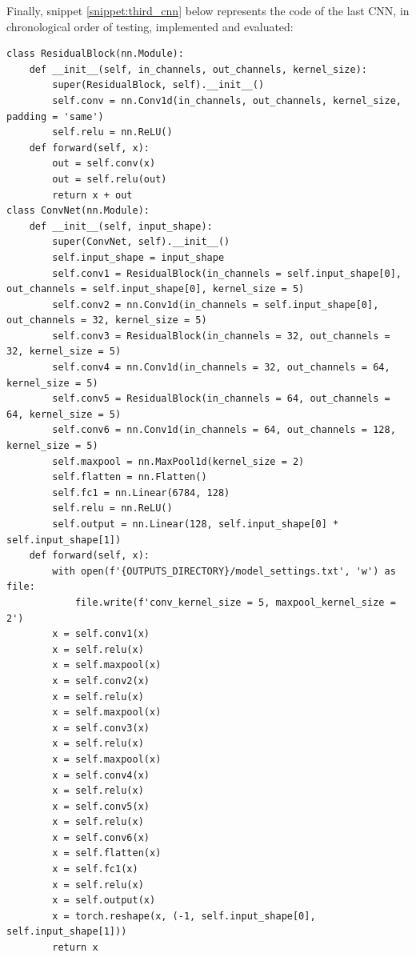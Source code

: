 \documentclass[12pt,italian]{report}
\begin{document}
Finally, snippet \ref{snippet:third_cnn} below represents the code of the last CNN, in chronological order of testing, implemented and evaluated:

\lstset{language=Python}
\begin{lstlisting}[aboveskip=15pt, belowskip=15pt, basicstyle=\fontsize{8}{10}\selectfont, keywordstyle=\color{blue}, breaklines=true, label=snippet:third_cnn]
class ResidualBlock(nn.Module):
    def __init__(self, in_channels, out_channels, kernel_size):
        super(ResidualBlock, self).__init__()
        self.conv = nn.Conv1d(in_channels, out_channels, kernel_size, padding = 'same')
        self.relu = nn.ReLU()
    def forward(self, x):
        out = self.conv(x)
        out = self.relu(out)
        return x + out
class ConvNet(nn.Module):
    def __init__(self, input_shape):
        super(ConvNet, self).__init__()
        self.input_shape = input_shape
        self.conv1 = ResidualBlock(in_channels = self.input_shape[0], out_channels = self.input_shape[0], kernel_size = 5)
        self.conv2 = nn.Conv1d(in_channels = self.input_shape[0], out_channels = 32, kernel_size = 5)
        self.conv3 = ResidualBlock(in_channels = 32, out_channels = 32, kernel_size = 5)
        self.conv4 = nn.Conv1d(in_channels = 32, out_channels = 64, kernel_size = 5)
        self.conv5 = ResidualBlock(in_channels = 64, out_channels = 64, kernel_size = 5)
        self.conv6 = nn.Conv1d(in_channels = 64, out_channels = 128, kernel_size = 5)
        self.maxpool = nn.MaxPool1d(kernel_size = 2)
        self.flatten = nn.Flatten()
        self.fc1 = nn.Linear(6784, 128)
        self.relu = nn.ReLU()
        self.output = nn.Linear(128, self.input_shape[0] * self.input_shape[1])
    def forward(self, x):
        with open(f'{OUTPUTS_DIRECTORY}/model_settings.txt', 'w') as file:
            file.write(f'conv_kernel_size = 5, maxpool_kernel_size = 2')
        x = self.conv1(x)
        x = self.relu(x)
        x = self.maxpool(x)
        x = self.conv2(x)
        x = self.relu(x)
        x = self.maxpool(x)
        x = self.conv3(x)
        x = self.relu(x)
        x = self.maxpool(x)
        x = self.conv4(x)
        x = self.relu(x)
        x = self.conv5(x)
        x = self.relu(x)
        x = self.conv6(x)
        x = self.flatten(x)
        x = self.fc1(x)
        x = self.relu(x)
        x = self.output(x)
        x = torch.reshape(x, (-1, self.input_shape[0], self.input_shape[1]))
        return x


\end{lstlisting}
\end{document}
